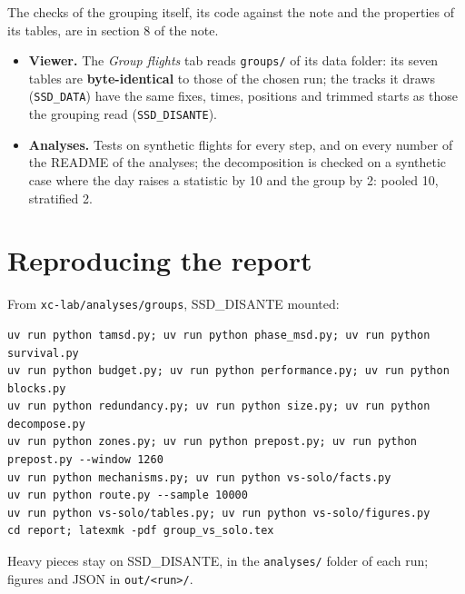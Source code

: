 The checks of the grouping itself, its code against the note and the properties of its tables, are in
section 8 of the note.

\begin{itemize}
  \item \textbf{Viewer.} The \emph{Group flights} tab reads \texttt{groups/} of its data folder: its seven tables are \textbf{byte-identical} to those of the chosen run; the tracks it draws (\texttt{SSD\_DATA}) have the same fixes,
        times, positions and trimmed starts as those the grouping read (\texttt{SSD\_DISANTE}).
  \item \textbf{Analyses.} Tests on synthetic flights for every step, and on every number of the README of the analyses; the decomposition is checked on a synthetic case where the day raises
        a statistic by 10 and the group by 2: pooled 10, stratified 2.
\end{itemize}

\section{Reproducing the report}\label{app:reproduce}

From \texttt{xc-lab/analyses/groups}, SSD\_DISANTE mounted:
\begin{verbatim}
uv run python tamsd.py; uv run python phase_msd.py; uv run python survival.py
uv run python budget.py; uv run python performance.py; uv run python blocks.py
uv run python redundancy.py; uv run python size.py; uv run python decompose.py
uv run python zones.py; uv run python prepost.py; uv run python prepost.py --window 1260
uv run python mechanisms.py; uv run python vs-solo/facts.py
uv run python route.py --sample 10000
uv run python vs-solo/tables.py; uv run python vs-solo/figures.py
cd report; latexmk -pdf group_vs_solo.tex
\end{verbatim}
Heavy pieces stay on SSD\_DISANTE, in the \texttt{analyses/} folder of each run; figures and JSON in \texttt{out/<run>/}.
